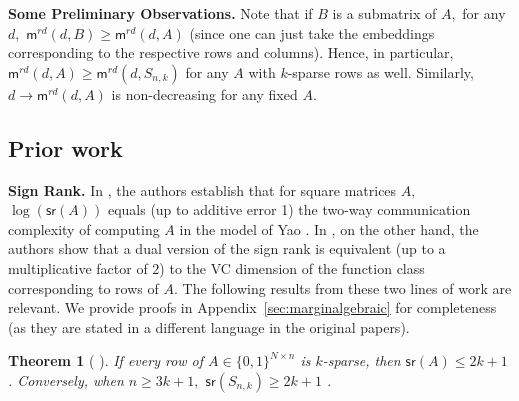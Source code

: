 \documentclass[preprint]{article}
\newtheorem{theorem}{Theorem}[section]
\newcommand{\maxmargin}{\mathsf{m}^{rd}}
\newcommand{\signrank}{\mathsf{sr}}
\newcommand{\ksparsen}{S_{n,k}}
\begin{document}

\textbf{Some Preliminary Observations.} Note that if $B$ is a submatrix of $A,$ for any $d,$
$\maxmargin(d, B)\ge \maxmargin(d,A)$ (since one can just take the embeddings corresponding to the respective rows and columns). Hence, in particular, $\maxmargin(d,A) \ge \maxmargin(d, \ksparsen)$ for any $A$ with $k$-sparse rows as well. Similarly, $d\longrightarrow \maxmargin(d, A)$ is non-decreasing for any fixed $A.$
\subsection{Prior work}
\label{subsec:prior-work}

\textbf{Sign Rank.} In \cite{paturi1986probabilistic}, the authors  establish that for square matrices $A,$ $\log(\signrank(A))$ equals (up to additive error 1) the two-way communication complexity of computing $A$ in the model of Yao \cite{yaocc79}. In \cite{alon2016sign}, on the other hand, the authors show that a dual version of the sign rank is equivalent (up to a multiplicative factor of $2$) to the VC dimension of the function class corresponding to rows of $A.$ The following results from these two lines of work are relevant. We provide proofs in Appendix~\ref{sec:marginalgebraic} for completeness (as they are stated in a different language in the original papers). 

\begin{theorem}[ \cite{AlonFranklRodl1985,alon2016sign}]
\label{thm:signrankforsparse}
If every row of $A\in \{0,1\}^{N \times n}$ is $k$-sparse, then $\signrank(A)\le 2k+1$ \cite{AlonFranklRodl1985}.
Conversely, when $n \ge 3k+1,$ $\signrank(\ksparsen)\ge 2k+1$ \cite{alon2016sign}. 
\end{theorem}
\end{document}
